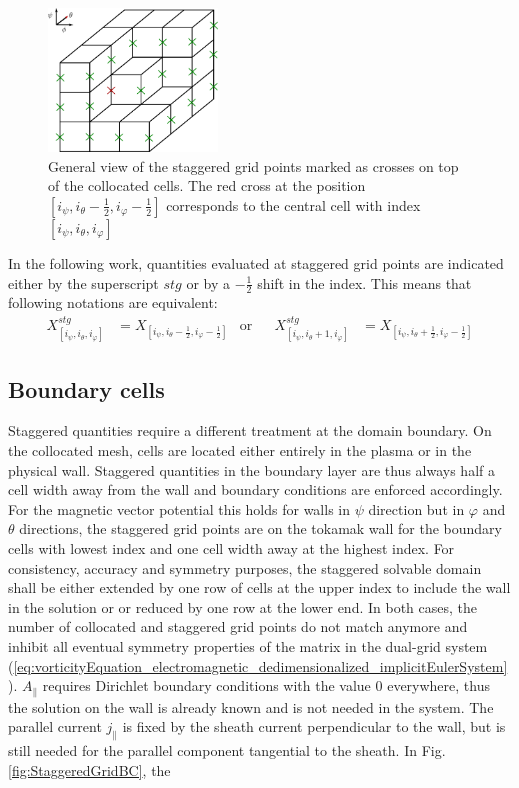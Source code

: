 \begin{figure}[H]
	\centering
	\includegraphics[width=0.4\textwidth]{schemes/StaggeredGrid.pdf}
	\caption{General view of the staggered grid points marked as crosses on top of the collocated cells. The red cross at the position $[i_\psi, i_\theta - \frac{1}{2}, i_\varphi-\frac{1}{2}]$ corresponds to the central cell with index $[i_\psi, i_\theta, i_\varphi]$}
	\label{fig:StaggeredGridOverview}
\end{figure}

In the following work, quantities evaluated at staggered grid points are indicated either by the superscript $stg$ or by a $-\frac{1}{2}$ shift in the index. This means that following notations are equivalent: 
\begin{align*}
	X^{stg}_{[i_\psi,i_\theta,i_\varphi]} &= X_{[i_\psi,i_\theta-\frac{1}{2},i_\varphi-\frac{1}{2}]} &\text{or}&& X^{stg}_{[i_\psi,i_\theta+1,i_\varphi]} &= X_{[i_\psi,i_\theta+\frac{1}{2},i_\varphi-\frac{1}{2}]}
\end{align*}



\subsection{Boundary cells}

Staggered quantities require a different treatment at the domain boundary. On the collocated mesh, cells are located either entirely in the plasma or in the physical wall. Staggered quantities in the boundary layer are thus always half a cell width away from the wall and boundary conditions are enforced accordingly. For the magnetic vector potential this holds for walls in $\psi$ direction but in $\varphi$ and $\theta$ directions, the staggered grid points are on the tokamak wall for the boundary cells with lowest index and one cell width away at the highest index. For consistency, accuracy and symmetry purposes, the staggered solvable domain shall be either extended by one row of cells at the upper index to include the wall in the solution or or reduced by one row at the lower end. In both cases, the number of collocated and staggered grid points do not match anymore and inhibit all eventual symmetry properties of the matrix in the dual-grid system (\ref{eq:vorticityEquation_electromagnetic_dedimensionalized_implicitEulerSystem}). $A_\parallel$ requires Dirichlet boundary conditions with the value 0 everywhere, thus the solution on the wall is already known and is not needed in the system. The parallel current $j_\parallel$ is fixed by the sheath current perpendicular to the wall, but is still needed for the parallel component tangential to the sheath. In Fig. \ref{fig:StaggeredGridBC}, the 

